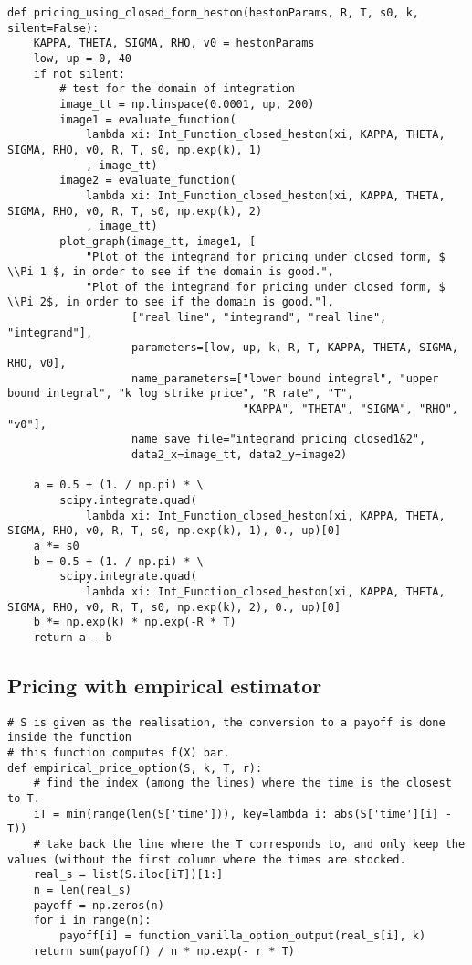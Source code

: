 \begin{Verbatim}[fontsize=\tiny]
def pricing_using_closed_form_heston(hestonParams, R, T, s0, k, silent=False):
    KAPPA, THETA, SIGMA, RHO, v0 = hestonParams
    low, up = 0, 40
    if not silent:
        # test for the domain of integration
        image_tt = np.linspace(0.0001, up, 200)
        image1 = evaluate_function(
            lambda xi: Int_Function_closed_heston(xi, KAPPA, THETA, SIGMA, RHO, v0, R, T, s0, np.exp(k), 1)
            , image_tt)
        image2 = evaluate_function(
            lambda xi: Int_Function_closed_heston(xi, KAPPA, THETA, SIGMA, RHO, v0, R, T, s0, np.exp(k), 2)
            , image_tt)
        plot_graph(image_tt, image1, [
            "Plot of the integrand for pricing under closed form, $ \\Pi 1 $, in order to see if the domain is good.",
            "Plot of the integrand for pricing under closed form, $ \\Pi 2$, in order to see if the domain is good."],
                   ["real line", "integrand", "real line", "integrand"],
                   parameters=[low, up, k, R, T, KAPPA, THETA, SIGMA, RHO, v0],
                   name_parameters=["lower bound integral", "upper bound integral", "k log strike price", "R rate", "T",
                                    "KAPPA", "THETA", "SIGMA", "RHO", "v0"],
                   name_save_file="integrand_pricing_closed1&2",
                   data2_x=image_tt, data2_y=image2)

    a = 0.5 + (1. / np.pi) * \
        scipy.integrate.quad(
            lambda xi: Int_Function_closed_heston(xi, KAPPA, THETA, SIGMA, RHO, v0, R, T, s0, np.exp(k), 1), 0., up)[0]
    a *= s0
    b = 0.5 + (1. / np.pi) * \
        scipy.integrate.quad(
            lambda xi: Int_Function_closed_heston(xi, KAPPA, THETA, SIGMA, RHO, v0, R, T, s0, np.exp(k), 2), 0., up)[0]
    b *= np.exp(k) * np.exp(-R * T)
    return a - b
\end{Verbatim}

\subsection{Pricing with empirical estimator}

\begin{Verbatim}[fontsize=\tiny]
# S is given as the realisation, the conversion to a payoff is done inside the function
# this function computes f(X) bar.
def empirical_price_option(S, k, T, r):
    # find the index (among the lines) where the time is the closest to T.
    iT = min(range(len(S['time'])), key=lambda i: abs(S['time'][i] - T))
    # take back the line where the T corresponds to, and only keep the values (without the first column where the times are stocked.
    real_s = list(S.iloc[iT])[1:]
    n = len(real_s)
    payoff = np.zeros(n)
    for i in range(n):
        payoff[i] = function_vanilla_option_output(real_s[i], k)
    return sum(payoff) / n * np.exp(- r * T) 

\end{Verbatim}

